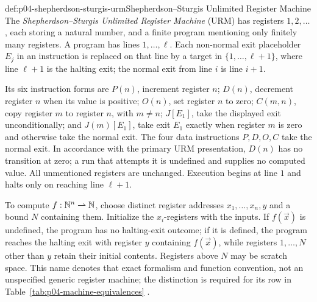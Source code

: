 \begin{hbdefinition}{def:p04-shepherdson-sturgis-urm}{Shepherdson--Sturgis Unlimited Register Machine}
The \emph{Shepherdson--Sturgis Unlimited Register Machine} (URM) has registers
\(1,2,\ldots\), each storing a natural number, and a finite program mentioning
only finitely many registers.  A program has lines \(1,\ldots,\ell\).  Each
non-normal exit placeholder \(E_j\) in an instruction is replaced on that
line by a target in \(\{1,\ldots,\ell+1\}\), where line \(\ell+1\) is the
halting exit; the normal exit from line \(i\) is line \(i+1\).

Its six instruction forms are \(P(n)\), increment register \(n\);
\(D(n)\), decrement register \(n\) when its value is positive;
\(O(n)\), set register \(n\) to zero; \(C(m,n)\), copy register \(m\) to
register \(n\), with \(m\ne n\); \(J[E_1]\), take the displayed exit
unconditionally; and \(J(m)[E_1]\), take exit \(E_1\) exactly when register
\(m\) is zero and otherwise take the normal exit.  The four data instructions
\(P,D,O,C\) take the normal exit.  In accordance with the primary URM
presentation, \(D(n)\) has no transition at zero; a run that attempts it is
undefined and supplies no computed value.  All unmentioned registers are
unchanged.  Execution begins at line \(1\) and halts only on reaching line
\(\ell+1\).

To compute \(f:\mathbb{N}^n\rightharpoonup\mathbb{N}\), choose distinct register addresses
\(x_1,\ldots,x_n,y\) and a bound \(N\) containing them.  Initialize the
\(x_i\)-registers with the inputs.  If \(f(\vec x)\) is undefined, the program
has no halting-exit outcome; if it is defined, the program reaches the halting
exit with register \(y\) containing \(f(\vec x)\), while registers
\(1,\ldots,N\) other than \(y\) retain their initial contents.  Registers
above \(N\) may be scratch space.
This name denotes that exact formalism and function convention, not an
unspecified generic register machine; the distinction is required for its row in
Table~\ref{tab:p04-machine-equivalences} \cite{ShepherdsonSturgis1963}.
\end{hbdefinition}

